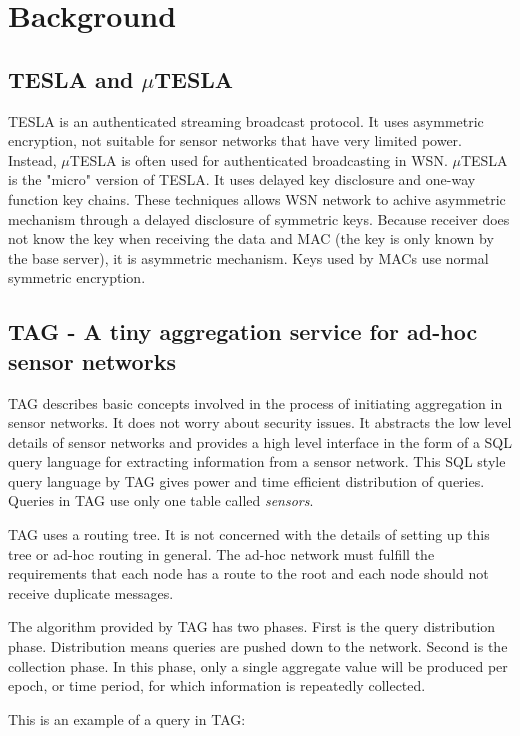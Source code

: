 \documentclass[a4paper]{article}
\begin{document}
\section{Background}
\label{sec:background}
\subsection{TESLA and $\mu$TESLA}

TESLA is an authenticated streaming broadcast protocol. It uses asymmetric
encryption, not suitable for sensor networks that have very limited
power. Instead, $\mu$TESLA is often used for authenticated broadcasting in
WSN. $\mu$TESLA is the "micro" version of TESLA. It uses delayed key
disclosure and one-way function key chains. These techniques allows WSN
network to achive asymmetric mechanism through a delayed disclosure of
symmetric keys. Because receiver does not know the key when receiving the data
and MAC (the key is only known by the base server), it is asymmetric
mechanism. Keys used by MACs use normal symmetric encryption.


\subsection{TAG - A tiny aggregation service for ad-hoc sensor networks}

TAG describes basic concepts involved in the process of initiating aggregation
in sensor networks. It does not worry about security issues. It abstracts the
low level details of sensor networks and provides a high level interface in
the form of a SQL query language for extracting information from a sensor
network. This SQL style query language by TAG gives power and time efficient
distribution of queries. Queries in TAG use only one table called {\em
  sensors}.

TAG uses a routing tree. It is not concerned with the details of setting up
this tree or ad-hoc routing in general. The ad-hoc network must fulfill the
requirements that each node has a route to the root and each node should not
receive duplicate messages.

The algorithm provided by TAG has two phases. First is the query distribution
phase. Distribution means queries are pushed down to the network. Second is
the collection phase. In this phase, only a single aggregate value will be
produced per epoch, or time period, for which information is repeatedly
collected.

This is an example of a query in TAG:
\end{document}
